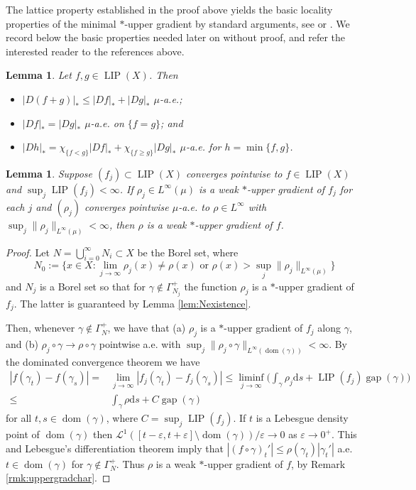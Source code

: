 \documentclass{amsart}
\newtheorem{lemma}[theorem]{Lemma}
\numberwithin{equation}{section}
\newcommand{\leb}{\mathcal{L}}
\newcommand{\LIP}{\operatorname{LIP}}
\newcommand{\gap}{\operatorname{gap}}
\newcommand{\dom}{\operatorname{dom}}
\newcommand{\ud}{\mathrm {d}}
\begin{document}
The lattice property established in the proof above yields the basic locality properties of the minimal $\ast$-upper gradient by standard arguments, see \cite[Chapter 6.3]{HKST07} or \cite[Chapter 2.2]{bjo11}. We record below the basic properties needed later on without proof, and refer the interested reader to the references above.

\begin{lemma}\label{lem:basic-prop-min-star-ug}
Let $f,g\in \LIP(X)$. Then
\begin{itemize}
	\item[(1)] $|D(f+g)|_\ast\le |Df|_\ast+|Dg|_\ast$ $\mu$-a.e.;
	\item[(2)] $|Df|_\ast=|Dg|_\ast$ $\mu$-a.e. on $\{f=g\}$; and 
	\item[(3)] $|Dh|_\ast=\chi_{\{f<g\}}|Df|_\ast+\chi_{\{f\ge g\}}|Dg|_\ast$ $\mu$-a.e. for $h=\min\{f,g\}$.
\end{itemize}
\end{lemma}

\begin{lemma}\label{lem:lim-star-ug}
Suppose $(f_j)\subset \LIP(X)$ converges pointwise to $f\in \LIP(X)$ and $\sup_j\LIP(f_j)<\infty$. If $\rho_j\in L^\infty(\mu)$ is a weak $\ast$-upper gradient of $f_j$ for each $j$ and $(\rho_j)$ converges pointwise $\mu$-a.e. to $\rho\in L^\infty$ with $\sup_j\|\rho_j\|_{L^\infty(\mu)}<\infty$, then $\rho$ is a weak $\ast$-upper gradient of $f$.
\end{lemma}
\begin{proof} 
Let $N=\bigcup_{i=0}^\infty N_i \subset X$ be the Borel set, where
\[
N_0:=\{x\in X: \lim_{j\to \infty} \rho_j(x)\neq \rho(x) \text{ or } \rho(x)> \sup_j\|\rho_j\|_{L^\infty(\mu)}\}
\]
and $N_j$ is a Borel set so that for $\gamma\not\in \Gamma_{N_j}^+$ the function $\rho_j$ is a $\ast$-upper gradient of $f_j$. The latter is guaranteed by Lemma \ref{lem:Nexistence}.

Then, whenever $\gamma\notin \Gamma_N^+$, we have that (a) $\rho_j$ is a $\ast$-upper gradient of $f_j$ along $\gamma$, and (b) $\rho_j\circ\gamma\to \rho\circ\gamma$ pointwise a.e. with $\sup_j\|\rho_j\circ\gamma\|_{L^\infty(\dom(\gamma))}<\infty$. By the dominated convergence theorem we have
\begin{align*}
|f(\gamma_t)-f(\gamma_s)|= & \lim_{j\to \infty}|f_j(\gamma_t)-f_j(\gamma_s)|\le \liminf_{j\to\infty}\bigg(\int_{\gamma}\rho_j\ud s+\LIP(f_j)\gap(\gamma)\bigg)\\
\leq & \int_\gamma\rho\ud s+C\gap(\gamma)
\end{align*}
for all $t,s\in\dom(\gamma)$, where $C=\sup_j\LIP(f_j)$. If $t$ is a Lebesgue density point of $\dom(\gamma)$ then $\leb^1([t-\varepsilon,t+\varepsilon]\setminus \dom(\gamma))/\varepsilon\to 0$ as $\varepsilon\to 0^+$. This and Lebesgue's differentiation theorem imply that $|(f\circ\gamma)_t'|\le \rho(\gamma_t)|\gamma_t'|$ a.e. $t\in \dom(\gamma)$ for $\gamma\notin\Gamma_N^+$. Thus $\rho$ is a weak $\ast$-upper gradient of $f$, by Remark \ref{rmk:uppergradchar}.
\end{proof}
\end{document}
